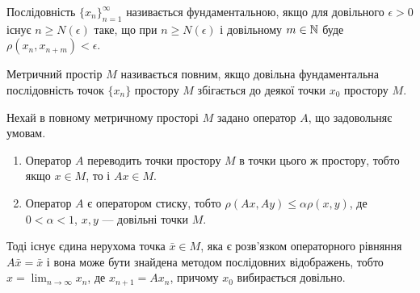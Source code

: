 \begin{definition} 
	Послідовність $\{x_n\}_{n=1}^\infty$ називається фундаментальною, як\-що для довільного $\epsilon > 0$ існує $n \ge N(\epsilon)$ таке, що при $n \ge N(\epsilon)$ і довільному $m\in\mathbb{N}$ буде $\rho(x_n,x_{n+m}) < \epsilon$.
\end{definition}

\begin{definition} 
	Метричний простір $M$ називається повним, якщо довільна фундаментальна послідовність точок $\{x_n\}$ простору $M$ збігається до деякої точки $x_0$ простору $M$.
\end{definition}

\begin{theorem} 
	Нехай в повному метричному просторі $M$ задано оператор $A$, що задовольняє умовам.
	\begin{enumerate}
		\item Оператор $A$ переводить точки простору $M$ в точки цього ж простору, тобто якщо $x\in M$, то і $Ax \in M$.
		\item Оператор $A$ є оператором стиску, тобто $\rho(Ax,Ay)\le\alpha\rho(x,y)$, де $0<\alpha<1$, $x,y$ --- довільні точки $M$. 
	\end{enumerate}

	Тоді існує єдина нерухома точка $\bar x \in M$, яка є розв'язком операторного рівняння $A\bar x=\bar x$ і вона може бути знайдена методом послідовних відображень, тобто $x = \lim_{n\to\infty} x_n$, де $x_{n+1} = A x_n$, причому $x_0$ вибирається довільно.
\end{theorem}

